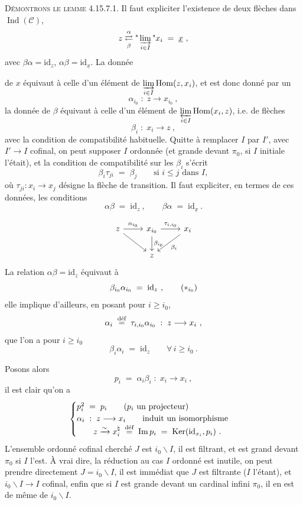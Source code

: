 \documentclass[11pt]{article}
\newcommand{\printedpage}[1]{\marginpar{\footnotesize p.~#1}}
\newcommand{\msp}[1]{\marginpar{\footnotesize [#1]}}
\newcommand{\cC}{\mathcal{C}}
\newcommand{\Hom}{\operatorname{Hom}}
\newcommand{\Ind}{\operatorname{Ind}}
\newcommand{\id}{\mathrm{id}}
\newcommand{\defeq}{\overset{\text{\upshape déf}}{=}}
\newcommand{\ux}{\underline{x}}
\newcommand{\Img}{\operatorname{Im}}
\newcommand{\Ker}{\operatorname{Ker}}
\begin{document}
\textsc{Démontrons le lemme} 4.15.7.1. Il faut expliciter l'existence de deux flèches dans $\Ind(\cC)$,
\[
z \underset{\beta}{\overset{\alpha}{\rightleftarrows}} \text{"}\varinjlim_{i\in I}\text{"} x_i \;=\; \ux\ ,
\]
avec $\beta\alpha = \id_z$, $\alpha\beta = \id_{\ux}$. La donnée

\msp{page 449}
de $x$ équivaut à celle d'un élément de $\varinjlim\limits_{i\in I} \Hom(z,x_i)$, et est donc donné par un %
\[
\alpha_{i_0} \;:\; z \longrightarrow x_{i_0}\ ,
\]
la donnée de $\beta$ équivaut à celle d'un élément de $\varprojlim\limits_{i\in I} \Hom(x_i,z)$, i.e. de flèches
\[
\beta_i \;:\; x_i \longrightarrow z\ ,
\]
avec la condition de compatibilité habituelle. Quitte à remplacer $I$ par $I'$, avec $I' \longrightarrow I$ cofinal, on peut supposer $I$ ordonnée (et grande devant $\pi_0$, si $I$ initiale l'était), et la condition de compatibilité sur les $\beta_i$ s'écrit
\[
\beta_i\tau_{ji} \;=\; \beta_j \qquad \text{si } i \leqslant j \text{ dans } I,
\]
où $\tau_{ji} : x_i \longrightarrow x_j$ désigne la flèche de transition. Il faut expliciter, en termes de ces données, les conditions
\[
\alpha\beta \;=\; \id_z\ , \qquad \beta\alpha \;=\; \id_{\ux}\ .
\]

\printedpage{173}
\[
\begin{tikzcd}
z \arrow[r, "\alpha_{i_0}"] \arrow[dr] & x_{i_0} \arrow[r, "\tau_{i,i_0}"] \arrow[d, "\beta_{i_0}"] & x_i \arrow[dl, "\beta_i"] \\
 & z &
\end{tikzcd}
\]
La relation $\alpha\beta = \id_z$ équivaut à
\[
\beta_{i_0}\alpha_{i_0} \;=\; \id_z\ , \tag*{$(*_{i_0})$}
\]
elle implique d'ailleurs, en posant pour $i \geqslant i_0$,
\[
\alpha_i \;\defeq\; \tau_{i,i_0}\alpha_{i_0} \;:\; z \longrightarrow x_i\ ,
\]
que l'on a pour $i \geqslant i_0$
\[
\beta_i\alpha_i \;=\; \id_z \qquad \forall\, i \geqslant i_0\ . \tag*{$(*_i)$}
\]

\msp{page 450}
Posons alors
\[
p_i \;=\; \alpha_i\beta_i \;:\; x_i \longrightarrow x_i\ ,
\]
il est clair qu'on a
\[
\begin{cases}
p_i^2 \;=\; p_i \qquad \text{($p_i$ un projecteur)} \\
\alpha_i \;:\; z \longrightarrow x_i \qquad \text{induit un isomorphisme} \\
\qquad z \xrightarrow{\sim} x_i^\natural \;\defeq\; \Img p_i \;=\; \Ker(\id_{x_i},p_i)\ .
\end{cases}
\]
L'ensemble ordonné cofinal cherché $J$ est $i_0\backslash I$, il est filtrant, et est grand devant $\pi_0$ si $I$ l'est. À vrai dire, la réduction au cas $I$ ordonné est inutile, on peut prendre directement $J = i_0\backslash I$, il est immédiat que $J$ est filtrante ($I$ l'étant), et $i_0\backslash I \longrightarrow I$ cofinal, enfin que si $I$ est grande devant un cardinal infini $\pi_0$, il en est de même de $i_0\backslash I$.
\end{document}
